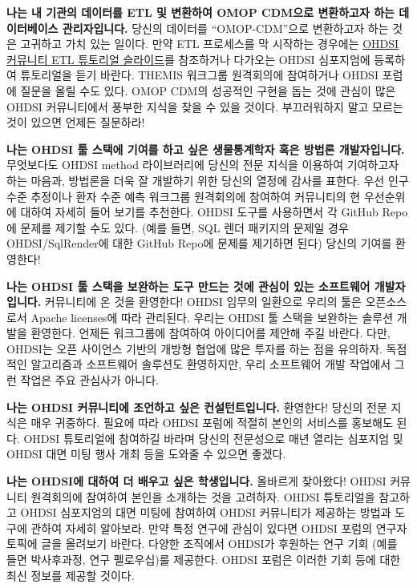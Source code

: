 \documentclass[10.5pt]{book}
\theoremstyle{definition}
\theoremstyle{definition}
\theoremstyle{definition}
\theoremstyle{remark}
\begin{document}
\textbf{나는 내 기관의 데이터를 ETL 및 변환하여 OMOP CDM으로 변환하고자
하는 데이터베이스 관리자입니다.} 당신의 데이터를 ``OMOP-CDM''으로
변환하고자 하는 것은 고귀하고 가치 있는 일이다. 만약 ETL 프로세스를 막
시작하는 경우에는
\href{https://www.ohdsi-europe.org/images/symposium-2019/tutorials/OHDSI_Vocabulary_CDM_Tutorial.pdf}{OHDSI
커뮤니티 ETL 튜토리얼 슬라이드}를 참조하거나 다가오는 OHDSI 심포지엄에
등록하여 튜토리얼을 듣기 바란다. THEMIS 워크그룹 원격회의에 참여하거나
OHDSI 포럼에 질문을 올릴 수도 있다. OMOP CDM의 성공적인 구현을 돕는 것에
관심이 많은 OHDSI 커뮤니티에서 풍부한 지식을 찾을 수 있을 것이다.
부끄러워하지 말고 모르는 것이 있으면 언제든 질문하라!

\textbf{나는 OHDSI 툴 스택에 기여를 하고 싶은 생물통계학자 혹은 방법론
개발자입니다.} 무엇보다도 OHDSI method 라이브러리에 당신의 전문 지식을
이용하여 기여하고자 하는 마음과, 방법론을 더욱 잘 개발하기 위한 당신의
열정에 감사를 표한다. 우선 인구 수준 추정이나 환자 수준 예측 워크그룹
원격회의에 참여하여 커뮤니티의 현 우선순위에 대하여 자세히 들어 보기를
추천한다. OHDSI 도구를 사용하면서 각 GitHub Repo에 문제를 제기할 수도
있다. (예를 들면, SQL 렌더 패키지의 문제일 경우 OHDSI/SqlRender에 대한
GitHub Repo에 문제를 제기하면 된다) 당신의 기여를 환영한다!

\textbf{나는 OHDSI 툴 스택을 보완하는 도구 만드는 것에 관심이 있는
소프트웨어 개발자입니다.} 커뮤니티에 온 것을 환영한다! OHDSI 임무의
일환으로 우리의 툴은 오픈소스로서 Apache licenses에 따라 관리된다.
우리는 OHDSI 툴 스택을 보완하는 솔루션 개발을 환영한다. 언제든
워크그룹에 참여하여 아이디어를 제안해 주길 바란다. 다만, OHDSI는 오픈
사이언스 기반의 개방형 협업에 많은 투자를 하는 점을 유의하자. 독점적인
알고리즘과 소프트웨어 솔루션도 환영하지만, 우리 소프트웨어 개발 작업에서
그런 작업은 주요 관심사가 아니다.

\textbf{나는 OHDSI 커뮤니티에 조언하고 싶은 컨설턴트입니다.} 환영한다!
당신의 전문 지식은 매우 귀중하다. 필요에 따라 OHDSI 포럼에 적절히 본인의
서비스를 홍보해도 된다. OHDSI 튜토리얼에 참여하길 바라며 당신의
전문성으로 매년 열리는 심포지엄 및 OHDSI 대면 미팅 행사 개최 등을 도와줄
수 있으면 좋겠다.

\textbf{나는 OHDSI에 대하여 더 배우고 싶은 학생입니다.} 올바르게
찾아왔다! OHDSI 커뮤니티 원격회의에 참여하여 본인을 소개하는 것을
고려하자. OHDSI 튜토리얼을 참고하고 OHDSI 심포지엄의 대면 미팅에
참여하여 OHDSI 커뮤니티가 제공하는 방법과 도구에 관하여 자세히 알아보라.
만약 특정 연구에 관심이 있다면 OHDSI 포럼의 연구자 토픽에 글을 올려보기
바란다. 다양한 조직에서 OHDSI가 후원하는 연구 기회 (예를 들면
박사후과정, 연구 펠로우십)를 제공한다. OHDSI 포럼은 이러한 기회 등에
대한 최신 정보를 제공할 것이다.
\end{document}
